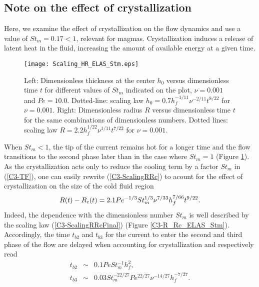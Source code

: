 \subsection{Note on the effect of crystallization}
\label{C3-sec:note-effect-cryst-1}

Here, we  examine the effect  of crystallization on the  flow dynamics
and  use   a  value   of  $St_m=0.17  <   1$,  relevant   for  magmas.
Crystallization  induces  a  release  of latent  heat  in  the  fluid,
increasing the amount of available energy at a given time.
\begin{figure}[h!]
  \begin{center}
    \graphicspath{ {/Users/thorey/Documents/These/Projet/Refroidissement/Skin_Model/Figure/JFM_V13/} }
    \texttt{[image: Scaling\_HR\_ELAS\_Stm.eps]}
    \caption{Left: Dimensionless thickness at  the center $h_0$ versus
      dimensionless time $t$ for  different values of $St_m$ indicated
      on the  plot, $\nu=0.001$ and $Pe  =10.0$.  Dotted-line: scaling
      law $h_0= 0.7h_f^{-1/11}\nu^{-2/11}t^{8/22}$  for $\nu = 0.001$.
      Right: Dimensionless  radius $R$  versus dimensionless  time $t$
      for  the same  combinations  of  dimensionless numbers.   Dotted
      lines:  scaling  law  $R=  2.2h_f^{1/22}\nu^{1/11}t^{7/22}$  for
      $\nu = 0.001$.}
    \label{C3-Scaling_HR_ELAS_Stm}
  \end{center}
\end{figure}
When $St_m<1$,  the tip of the  current remains hot for  a longer time
and the  flow transitions to the  second phase later than  in the case
where   $St_m=1$   (Figure  \ref{C3-Scaling_HR_ELAS_Stm}).    As   the
crystallization  acts only  to reduce  the  cooling term  by a  factor
$St_m$ in (\ref{C3-TF}), one  can easily rewrite (\ref{C3-ScalingRRc})
to acount  for the effect of  crystallization on the size  of the cold
fluid region
\begin{equation}
  R(t)-R_c(t) =2.1Pe^{-1/3}St_m^{1/3}\nu^{7/33}
  h_f^{7/66}t^{9/22}.\label{C3-ScalingRRcFinal}\\
\end{equation}
Indeed, the  dependence with the  dimensionless number $St_m$  is well
described  by  the   scaling  law  (\ref{C3-ScalingRRcFinal})  (Figure
\ref{C3-R_Rc_ELAS_Stm}).  Accordingly, the  time $t_{b2}$ and $t_{b3}$
for the current  to enter the second  and third phase of  the flow are
delayed when accounting for crystallization and respectively read
\begin{eqnarray}
  t_{b2}&\sim&0.1Pe St_m^{-1} h_f^2,\label{C3-tb2}\\
  t_{b3}&\sim& 0.03 St_m^{-22/27}Pe^{22/27}\nu^{-14/27}h_f^{-7/27}.\label{C3-tb3}
\end{eqnarray}
